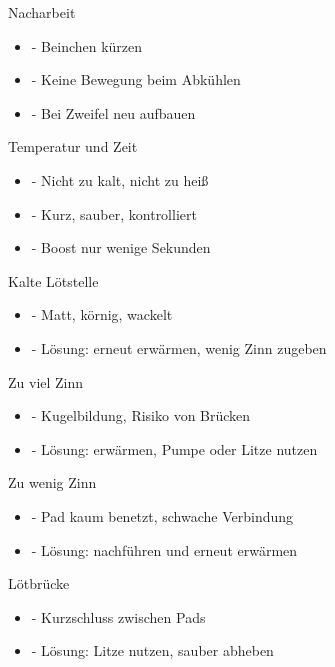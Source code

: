 \begin{frame}{Nacharbeit}
\begin{itemize}\setlength{\itemsep}{3mm}
    \item - Beinchen kürzen
    \item - Keine Bewegung beim Abkühlen
    \item - Bei Zweifel neu aufbauen
\end{itemize}
\end{frame}

\begin{frame}{Temperatur und Zeit}
\begin{itemize}\setlength{\itemsep}{3mm}
    \item - Nicht zu kalt, nicht zu heiß
    \item - Kurz, sauber, kontrolliert
    \item - Boost nur wenige Sekunden
\end{itemize}
\end{frame}

\begin{frame}{Kalte Lötstelle}
\begin{itemize}\setlength{\itemsep}{3mm}
    \item - Matt, körnig, wackelt
    \item - Lösung: erneut erwärmen, wenig Zinn zugeben
\end{itemize}
\end{frame}

\begin{frame}{Zu viel Zinn}
\begin{itemize}\setlength{\itemsep}{3mm}
    \item - Kugelbildung, Risiko von Brücken
    \item - Lösung: erwärmen, Pumpe oder Litze nutzen
\end{itemize}
\end{frame}

\begin{frame}{Zu wenig Zinn}
\begin{itemize}\setlength{\itemsep}{3mm}
    \item - Pad kaum benetzt, schwache Verbindung
    \item - Lösung: nachführen und erneut erwärmen
\end{itemize}
\end{frame}

\begin{frame}{Lötbrücke}
\begin{itemize}\setlength{\itemsep}{3mm}
    \item - Kurzschluss zwischen Pads
    \item - Lösung: Litze nutzen, sauber abheben
\end{itemize}
\end{frame}

